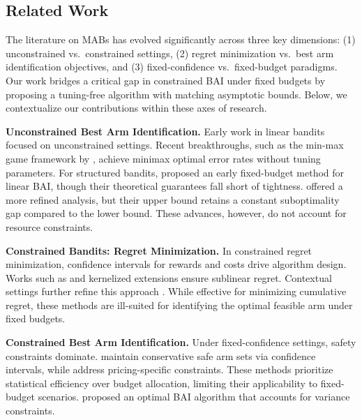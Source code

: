\documentclass[accepted]{uai2025} %
\theoremstyle{plain}
\theoremstyle{definition}
\theoremstyle{remark}
\begin{document}
\vspace{-.1in}
\subsection{Related Work}\vspace{-.1in}

The literature on MABs  has evolved significantly across three key dimensions: (1) unconstrained vs.\ constrained settings, (2) regret minimization vs.\ best arm identification objectives, and (3) fixed-confidence vs.\ fixed-budget paradigms. Our work bridges a critical gap in constrained BAI under fixed budgets by proposing a tuning-free algorithm with matching asymptotic bounds. Below, we contextualize our contributions within these axes of research.

\textbf{Unconstrained Best Arm Identification.} Early work in linear bandits focused on unconstrained settings. Recent breakthroughs, such as the min-max game framework by \citet{li2024optimal}, achieve minimax optimal error rates without tuning parameters. For structured bandits, \citet{azizi2021fixed} proposed an early fixed-budget method for linear BAI, though their theoretical guarantees fall short of tightness. \citet{yang2022minimax} offered a more refined analysis, but their upper bound retains a constant suboptimality gap compared to the lower bound. These advances, however, do not account for resource constraints.

\textbf{Constrained Bandits: Regret Minimization.} In constrained regret minimization, confidence intervals for rewards and costs drive algorithm design. Works such as \citet{amani2019linear, moradipari2021safe} and kernelized extensions \citep{zhou2022kernelized} ensure sublinear regret. Contextual settings further refine this approach \citep{pacchiano2024contextual}. While effective for minimizing cumulative regret, these methods are ill-suited for identifying the optimal feasible arm under fixed budgets.

\textbf{Constrained Best Arm Identification.} Under fixed-confidence settings, safety constraints dominate. \citet{katz2019top, camilleri2022active} maintain conservative safe arm sets via confidence intervals, while \citet{wang2022best, shang2023price} address pricing-specific constraints. These methods prioritize statistical efficiency over budget allocation, limiting their applicability to fixed-budget scenarios. \citet{Hou23} proposed an  optimal BAI algorithm that accounts for variance constraints. 
\end{document}
